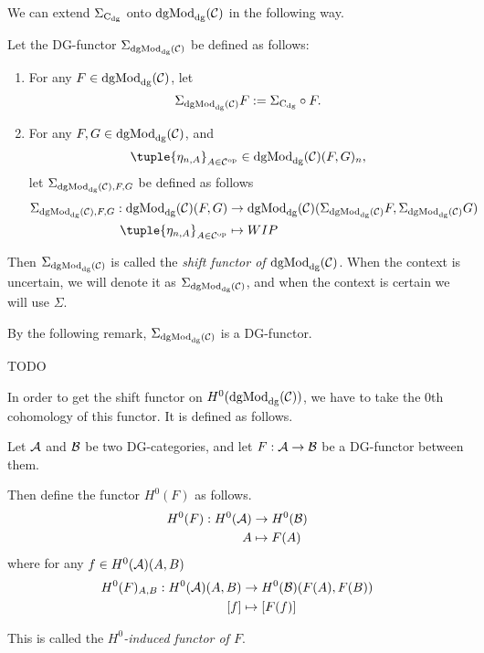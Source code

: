 We can extend \( \Sigma_{\operatorname{C}_{\operatorname{dg}}} \) onto \( \operatorname{dgMod}_{\operatorname{dg}}({\mathcal{C}}) \) in the following way.

\begin{definition}
    \label{def:sigma_dgmod}
    Let the DG-functor \( \Sigma_{\operatorname{dgMod}_{\operatorname{dg}}({\mathcal{C}})} \) be defined as follows:
    \begin{enumerate}
        \item {
            For any \( F \in \operatorname{dgMod}_{\operatorname{dg}}({\mathcal{C}}) \), let
            \[
                \Sigma_{\operatorname{dgMod}_{\operatorname{dg}}({\mathcal{C}})} F := \Sigma_{\operatorname{C}_{\operatorname{dg}}} \circ F.
            \]
        }
        \item {
            For any \( F, G \in \operatorname{dgMod}_{\operatorname{dg}}({\mathcal{C}}) \), and
            \[
                \tuple{\eta_{n, A}}_{A \in \Cc^{\op}} \in \dgMod_{\dg}(\Cc)(F, G)_n,
            \]
            let \( \Sigma_{\operatorname{dgMod}_{\operatorname{dg}}({\mathcal{C}}), F, G} \) be defined as follows
            \begin{align*}
                \Sigma_{\dgMod_{\dg}(\Cc), F, G}: \dgMod_{\dg}(\Cc)(F, G) &\to \dgMod_{\dg}(\Cc)(\Sigma_{\dgMod_{\dg}(\Cc)} F, \Sigma_{\dgMod_{\dg}(\Cc)} G) \\
                \tuple{\eta_{n, A}}_{A \in \Cc^{\op}} &\mapsto WIP
            \end{align*}
        }
    \end{enumerate}
    Then \( \Sigma_{\operatorname{dgMod}_{\operatorname{dg}}({\mathcal{C}})} \) is called the \emph{shift functor of \( \operatorname{dgMod}_{\operatorname{dg}}({\mathcal{C}}) \)}. When the context is uncertain, we will denote it as \( \Sigma_{\operatorname{dgMod}_{\operatorname{dg}}({\mathcal{C}})} \), and when the context is certain we will use \( \Sigma \).
\end{definition}

By the following remark, \( \Sigma_{\operatorname{dgMod}_{\operatorname{dg}}({\mathcal{C}})} \) is a DG-functor.

\begin{remark}
    TODO
\end{remark}

In order to get the shift functor on \( H^0(\operatorname{dgMod}_{\operatorname{dg}}({\mathcal{C}})) \), we have to take the \( 0 \)th cohomology of this functor. It is defined as follows.

\begin{definition}
    \label{def:H^0-induced_functor}
    Let \( {\mathcal{A}} \) and \( {\mathcal{B}} \) be two DG-categories, and let \( F: {\mathcal{A}} \to {\mathcal{B}} \) be a DG-functor between them.

    Then define the functor \( H^0(F) \) as follows.
    \begin{align*}
        H^0(F): H^0({\mathcal{A}}) &\to H^0({\mathcal{B}}) \\
        A &\mapsto F(A)
    \end{align*}
    where for any \( f \in H^0({\mathcal{A}})(A, B) \)
    \begin{align*}
        H^0(F)_{A, B}: H^0({\mathcal{A}})(A, B) &\to H^0({\mathcal{B}})(F(A), F(B)) \\
        [f] &\mapsto [F(f)]
    \end{align*}

    This is called the \emph{\( H^0 \)-induced functor of \( F \)}.
\end{definition}

